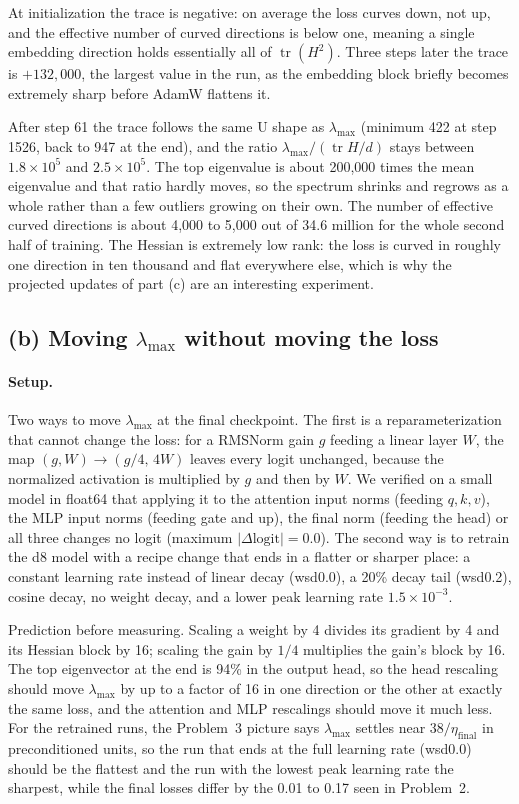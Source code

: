 \documentclass[10pt,letterpaper]{article}
\newcommand{\lmax}{\lambda_{\max}}
\begin{document}
At initialization the trace is negative: on average the loss curves down, not up, and the effective number of curved directions is below one, meaning a single embedding direction holds essentially all of $\operatorname{tr}(H^2)$. Three steps later the trace is $+132{,}000$, the largest value in the run, as the embedding block briefly becomes extremely sharp before AdamW flattens it.

After step 61 the trace follows the same U shape as $\lmax$ (minimum 422 at step 1526, back to 947 at the end), and the ratio $\lmax/(\operatorname{tr}H/d)$ stays between $1.8\times10^{5}$ and $2.5\times10^{5}$. The top eigenvalue is about 200,000 times the mean eigenvalue and that ratio hardly moves, so the spectrum shrinks and regrows as a whole rather than a few outliers growing on their own. The number of effective curved directions is about 4,000 to 5,000 out of 34.6 million for the whole second half of training. The Hessian is extremely low rank: the loss is curved in roughly one direction in ten thousand and flat everywhere else, which is why the projected updates of part (c) are an interesting experiment.


\subsection*{(b) Moving $\lmax$ without moving the loss}

\paragraph{Setup.} Two ways to move $\lmax$ at the final checkpoint. The first is a reparameterization that cannot change the loss: for a RMSNorm gain $g$ feeding a linear layer $W$, the map $(g, W)\to(g/4,\,4W)$ leaves every logit unchanged, because the normalized activation is multiplied by $g$ and then by $W$. We verified on a small model in float64 that applying it to the attention input norms (feeding $q,k,v$), the MLP input norms (feeding gate and up), the final norm (feeding the head) or all three changes no logit (maximum $|\Delta\text{logit}|=0.0$). The second way is to retrain the d8 model with a recipe change that ends in a flatter or sharper place: a constant learning rate instead of linear decay (wsd0.0), a 20\% decay tail (wsd0.2), cosine decay, no weight decay, and a lower peak learning rate $1.5\times10^{-3}$.

Prediction before measuring. Scaling a weight by 4 divides its gradient by 4 and its Hessian block by 16; scaling the gain by $1/4$ multiplies the gain's block by 16. The top eigenvector at the end is 94\% in the output head, so the head rescaling should move $\lmax$ by up to a factor of 16 in one direction or the other at exactly the same loss, and the attention and MLP rescalings should move it much less. For the retrained runs, the Problem~3 picture says $\lmax$ settles near $38/\eta_{\mathrm{final}}$ in preconditioned units, so the run that ends at the full learning rate (wsd0.0) should be the flattest and the run with the lowest peak learning rate the sharpest, while the final losses differ by the 0.01 to 0.17 seen in Problem~2.
\end{document}
